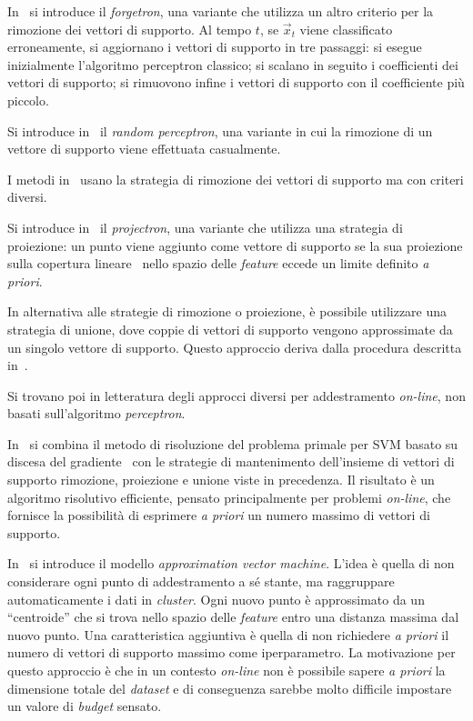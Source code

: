 In~\cite{2005_forgetron} si introduce il \emph{forgetron}, una variante che utilizza un altro criterio per la rimozione dei vettori di supporto. 
Al tempo $t$, se $\Vec{x}_t$ viene classificato erroneamente, si aggiornano i vettori di supporto in tre passaggi: si esegue inizialmente l'algoritmo perceptron classico; si scalano in seguito i coefficienti dei vettori di supporto; si rimuovono infine i vettori di supporto con il coefficiente più piccolo.

Si introduce in~\cite{2007_random_removal} il \emph{random perceptron}, una variante in cui la rimozione di un vettore di supporto viene effettuata casualmente.

I metodi in~\cite{2003_online_classification_on_a_budget,2005_forgetron,2007_random_removal} usano la strategia di rimozione dei vettori di supporto ma con criteri diversi.

Si introduce in~\cite{2008_projectron} il \emph{projectron}, una variante che utilizza una strategia di proiezione: un punto viene aggiunto come vettore di supporto se la sua proiezione sulla copertura lineare~\cite{2008_projectron} nello spazio delle \emph{feature} eccede un limite definito \emph{a priori}. 
%

In alternativa alle strategie di rimozione o proiezione, è possibile utilizzare una strategia di unione, dove coppie di vettori di supporto vengono approssimate da un singolo vettore di supporto.
Questo approccio deriva dalla procedura descritta in~\cite{2005_merging_strategy}.

Si trovano poi in letteratura degli approcci diversi per addestramento \emph{on-line}, non basati sull'algoritmo \emph{perceptron}.

In~\cite{2012_bsgd} si combina il metodo di risoluzione del problema primale per SVM basato su discesa del gradiente~\cite{2007_chappelle_training_svm_primal, pegasos_solver} con le strategie di mantenimento dell'insieme di vettori di supporto rimozione, proiezione e unione viste in precedenza. 
Il risultato è un algoritmo risolutivo efficiente, pensato principalmente per problemi \emph{on-line}, che fornisce la possibilità di esprimere \emph{a priori} un numero massimo di vettori di supporto.

In~\cite{2017_approximation_vm} si introduce il modello \emph{approximation vector machine}. 
L'idea è quella di non considerare ogni punto di addestramento a sé stante, ma raggruppare automaticamente  i dati in \emph{cluster}. 
Ogni nuovo punto è approssimato da un ``centroide'' che si trova nello spazio delle \emph{feature} entro una distanza massima dal nuovo punto. 
Una caratteristica aggiuntiva è quella di non richiedere \emph{a priori} il numero di vettori di supporto massimo come iperparametro.
La motivazione per questo approccio è che in un contesto \emph{on-line} non è possibile sapere \emph{a priori} la dimensione totale del \emph{dataset} e di conseguenza sarebbe molto difficile impostare un valore di \emph{budget} sensato. 


